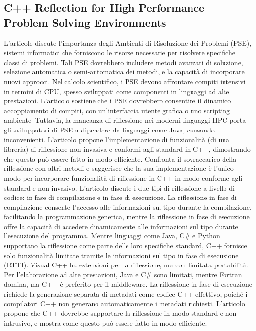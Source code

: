 \documentclass[11pt]{article}
\begin{document}
\begin{multicols*}{2}[\columnsep=1cm]
    \section{C++ Reflection for High Performance Problem Solving Environments}
    L'articolo discute l'importanza degli Ambienti di Risoluzione dei Problemi (PSE), sistemi informatici che forniscono le risorse necessarie per risolvere specifiche classi di problemi. Tali PSE dovrebbero includere metodi avanzati di soluzione, selezione automatica o semi-automatica dei metodi, e la capacità di incorporare nuovi approcci.
    Nel calcolo scientifico, i PSE devono affrontare compiti intensivi in termini di CPU, spesso sviluppati come componenti in linguaggi ad alte prestazioni. L'articolo sostiene che i PSE dovrebbero consentire il dinamico accoppiamento di compiti, con un'interfaccia utente grafica o uno scripting ambiente. Tuttavia, la mancanza di riflessione nei moderni linguaggi HPC porta gli sviluppatori di PSE a dipendere da linguaggi come Java, causando inconvenienti.
    L'articolo propone l'implementazione di funzionalità (di una libreria) di riflessione non invasiva e conformi agli standard in C++, dimostrando che questo può essere fatto in modo efficiente. Confronta il sovraccarico della riflessione con altri metodi e suggerisce che la sua implementazione è l'unico modo per incorporare funzionalità di riflessione in C++ in modo conforme agli standard e non invasivo.
    L'articolo discute i due tipi di riflessione a livello di codice: in fase di compilazione e in fase di esecuzione. La riflessione in fase di compilazione consente l'accesso alle informazioni sul tipo durante la compilazione, facilitando la programmazione generica, mentre la riflessione in fase di esecuzione offre la capacità di accedere dinamicamente alle informazioni sul tipo durante l'esecuzione del programma.
    Mentre linguaggi come Java, C\# e Python supportano la riflessione come parte delle loro specifiche standard, C++ fornisce solo funzionalità limitate tramite le informazioni sul tipo in fase di esecuzione (RTTI). Visual C++ ha estensioni per la riflessione, ma con limitata portabilità. Per l'elaborazione ad alte prestazioni, Java e C\# sono limitati, mentre Fortran domina, ma C++ è preferito per il middleware.
    La riflessione in fase di esecuzione richiede la generazione separata di metadati come codice C++ effettivo, poiché i compilatori C++ non generano automaticamente i metadati richiesti. L'articolo propone che C++ dovrebbe supportare la riflessione in modo standard e non intrusivo, e mostra come questo può essere fatto in modo efficiente.
    

\end{multicols*}
\end{document}
